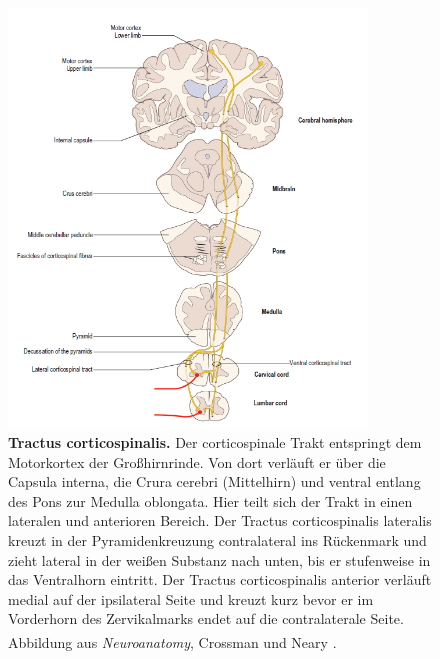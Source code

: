 \begin{figure}[H]
    \centering
    \includegraphics[width=0.85\textwidth]{pictures/Bilder_Laura/corticospinal_tract.PNG}
    \caption[Tractus corticospinalis]{\textbf{Tractus corticospinalis.} Der corticospinale Trakt entspringt dem Motorkortex der Großhirnrinde. Von dort verläuft er über die Capsula interna, die Crura cerebri (Mittelhirn) und ventral entlang des Pons zur Medulla oblongata. Hier teilt sich der Trakt in einen lateralen und anterioren Bereich. Der Tractus corticospinalis lateralis kreuzt in der Pyramidenkreuzung contralateral ins Rückenmark und zieht lateral in der weißen Substanz nach unten, bis er stufenweise in das Ventralhorn eintritt. Der Tractus corticospinalis anterior verläuft medial auf der ipsilateral Seite und kreuzt kurz bevor er im Vorderhorn des Zervikalmarks endet auf die contralaterale Seite. \\
    Abbildung aus \textit{Neuroanatomy}, Crossman und Neary \textsuperscript{\cite[8]{crossman2014neuroanatomy}}.}
    \label{fig:tr_corticospinalis}
\end{figure}

